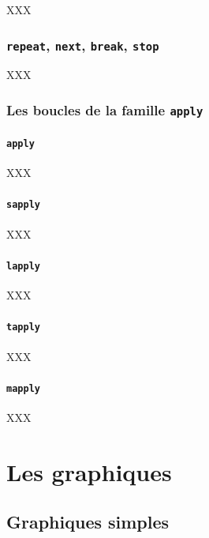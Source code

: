 \documentclass[]{book}
\begin{document}
XXX

\section{\texorpdfstring{\texttt{repeat}, \texttt{next}, \texttt{break},
\texttt{stop}}{repeat, next, break, stop}}\label{repeat-next-break-stop}

XXX

\section{\texorpdfstring{Les boucles de la famille
\texttt{apply}}{Les boucles de la famille apply}}\label{les-boucles-de-la-famille-apply}

\subsection{\texorpdfstring{\texttt{apply}}{apply}}\label{apply}

XXX

\subsection{\texorpdfstring{\texttt{sapply}}{sapply}}\label{sapply}

XXX

\subsection{\texorpdfstring{\texttt{lapply}}{lapply}}\label{lapply}

XXX

\subsection{\texorpdfstring{\texttt{tapply}}{tapply}}\label{tapply}

XXX

\subsection{\texorpdfstring{\texttt{mapply}}{mapply}}\label{mapply}

XXX

\part{Les graphiques}\label{part-les-graphiques}

\chapter{Graphiques simples}\label{graph1}
\end{document}
